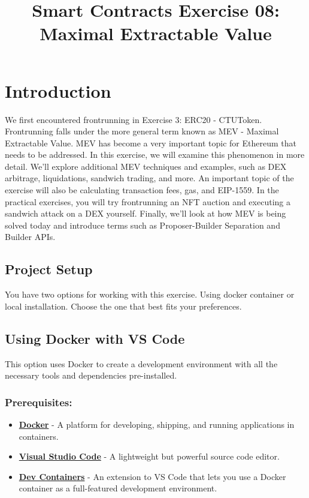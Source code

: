 \documentclass[12pt]{article}
\title{Smart Contracts Exercise 08: \\ Maximal Extractable Value}
\author{}
\date{}
\begin{document}
\maketitle
\section{Introduction}

We first encountered frontrunning in Exercise 3: ERC20 - CTUToken. Frontrunning falls under the more general term known as MEV - Maximal Extractable Value. MEV has become a very important topic for Ethereum that needs to be addressed. In this exercise, we will examine this phenomenon in more detail. We'll explore additional MEV techniques and examples, such as DEX arbitrage, liquidations, sandwich trading, and more. An important topic of the exercise will also be calculating transaction fees, gas, and EIP-1559. In the practical exercises, you will try frontrunning an NFT auction and executing a sandwich attack on a DEX yourself. Finally, we'll look at how MEV is being solved today and introduce terms such as Proposer-Builder Separation and Builder APIs.

\subsection*{Project Setup}

You have two options for working with this exercise. Using docker container or local installation. Choose the one that best fits your preferences.

\subsection{Using Docker with VS Code}

This option uses Docker to create a development environment with all the necessary tools and dependencies pre-installed.

\subsubsection*{Prerequisites:}

\begin{itemize}
    \item \textbf{\href{https://www.docker.com/products/docker-desktop}{Docker}} - A platform for developing, shipping, and running applications in containers.
    \item \textbf{\href{https://code.visualstudio.com/}{Visual Studio Code}} - A lightweight but powerful source code editor.
    \item \textbf{\href{https://marketplace.visualstudio.com/items?itemName=ms-vscode-remote.remote-containers}{Dev Containers}} - An extension to VS Code that lets you use a Docker container as a full-featured development environment.
\end{itemize}
\end{document}
